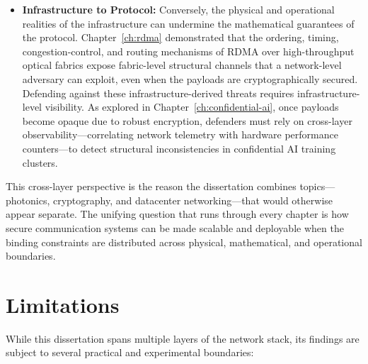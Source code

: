 \begin{itemize}
    \item \textbf{Infrastructure to Protocol:} Conversely, the physical and operational realities of the infrastructure can undermine the mathematical guarantees of the protocol. Chapter~\ref{ch:rdma} demonstrated that the ordering, timing, congestion-control, and routing mechanisms of RDMA over high-throughput optical fabrics expose fabric-level structural channels that a network-level adversary can exploit, even when the payloads are cryptographically secured. Defending against these infrastructure-derived threats requires infrastructure-level visibility. As explored in Chapter~\ref{ch:confidential-ai}, once payloads become opaque due to robust encryption, defenders must rely on cross-layer observability---correlating network telemetry with hardware performance counters---to detect structural inconsistencies in confidential AI training clusters.
\end{itemize}

This cross-layer perspective is the reason the dissertation combines topics---photonics,
cryptography, and datacenter networking---that would otherwise appear separate. The unifying
question that runs through every chapter is how secure communication systems can be made
scalable and deployable when the binding constraints are distributed across physical,
mathematical, and operational boundaries.

\section{Limitations}

While this dissertation spans multiple layers of the network stack, its findings are subject to several practical and experimental boundaries:

